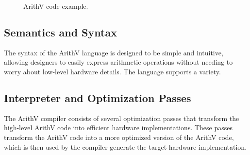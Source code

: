 \begin{figure}[t]
\centering
{}
\caption{ArithV code example.}
\label{lst:addertree}
\end{figure}

\subsection{Semantics and Syntax}
The syntax of the ArithV language is designed to be simple and intuitive, allowing designers to easily express arithmetic operations without needing to worry about low-level hardware details.
The language supports a variety. 

\subsection{Interpreter and Optimization Passes}
The ArithV compiler consists of several optimization passes that transform the high-level ArithV code into efficient hardware implementations.
These passes transform the ArithV code into a more optimized version of the ArithV code, which is then used by the compiler generate the target hardware implementation.



